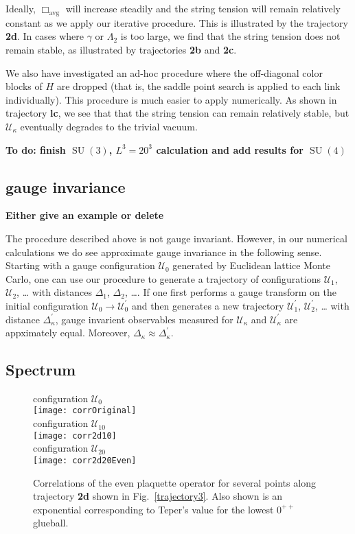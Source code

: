 \documentclass[preprint,aps,prd]{revtex4-2}
\newcommand{\plaquette}{\Box}
\newcommand{\config}{\mathcal{U}}
\DeclareMathOperator{\SU}{SU}
\begin{document}
Ideally, $\plaquette_\mathrm{avg}$ will increase steadily and the string tension will remain relatively constant as we apply our iterative procedure.
This is illustrated by the trajectory {\bf 2d}.
In cases where $\gamma$ or $\Lambda_2$ is too large, we find that the
string tension does not remain stable, as illustrated by
trajectories {\bf 2b} and {\bf 2c}.

We also have investigated an ad-hoc procedure where
the off-diagonal color blocks of $H$ are dropped (that is, the
saddle point search is applied to each link individually).
This procedure is much easier to apply numerically.
As shown in trajectory {\bf lc},
we see that that the string tension can remain relatively stable,
but $\config_\kappa$ eventually degrades to the trivial vacuum.

{\bf  To do:
  finish $\SU(3)$, $L^3=20^3$ calculation and
  add results for $\SU(4)$}

\subsection{gauge invariance}

{\bf Either give an example or delete }

The procedure described above is not gauge invariant.
However, in our numerical calculations we do see approximate
gauge invariance in the following
sense.  Starting with a gauge configuration $\config_0$ generated
by Euclidean lattice Monte Carlo, one can
use our procedure to generate a trajectory of configurations
$\config_1$, $\config_2$, \ldots
with distances $\Delta_1$, $\Delta_2$, \ldots.
If one first performs a gauge transform on the initial
configuration $\config_0 \to \config_0^\prime$ and then generates a
new trajectory $\config_1^\prime$, $\config_2^\prime$, \ldots
with distance $\Delta_\kappa^\prime$,
gauge invarient observables
measured for $\config_\kappa$ and $\config_\kappa^\prime$ are appximately equal.
Moreover,  $\Delta_\kappa \approx \Delta_\kappa^\prime$.


\subsection{Spectrum}

\begin{figure}
   configuration $\config_0$\\
   \texttt{[image: corrOriginal]}\\
   configuration $\config_{10}$\\
   \texttt{[image: corr2d10]}\\
   configuration $\config_{20}$\\
   \texttt{[image: corr2d20Even]}
\caption{Correlations of the even plaquette operator for several points
  along trajectory {\bf 2d} shown in Fig.~\ref{trajectory3}.
  Also shown is an exponential corresponding to Teper's value
  for the lowest $0^{++}$ glueball.
  \label{corr2dEven}}
\end{figure}
\end{document}
